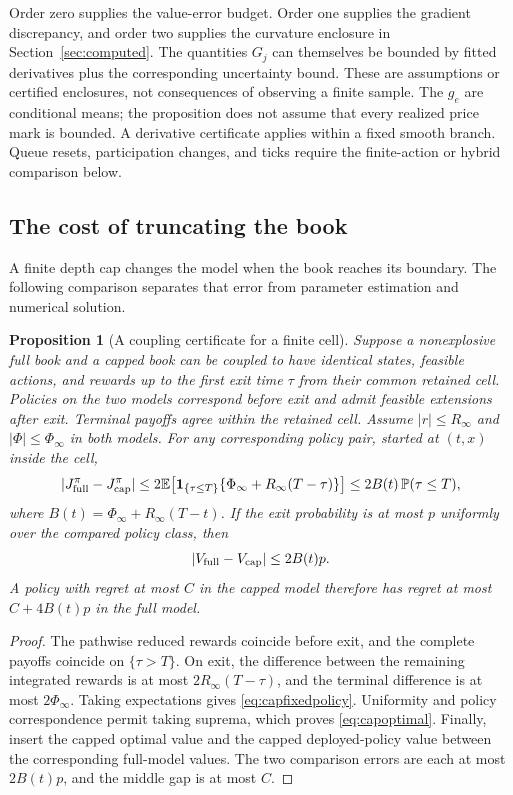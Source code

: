 \documentclass[11pt]{article}
\theoremstyle{plain}
\newtheorem{proposition}[theorem]{Proposition}
\theoremstyle{definition}
\theoremstyle{remark}
\newcommand{\E}{\mathbb E}
\begin{document}
Order zero supplies the value-error budget. Order one supplies the
gradient discrepancy, and order two supplies the curvature enclosure
in Section~\ref{sec:computed}. The quantities \(G_j\) can themselves be
bounded by fitted derivatives plus the corresponding uncertainty
bound. These are assumptions or certified enclosures, not consequences
of observing a finite sample. The \(g_e\) are conditional means;
the proposition does not assume that every realized price mark is
bounded. A derivative certificate applies within a fixed smooth
branch. Queue resets, participation changes, and ticks require the
finite-action or hybrid comparison below.

\subsection{The cost of truncating the book}

A finite depth cap changes the model when the book reaches its
boundary. The following comparison separates that error from
parameter estimation and numerical solution.

\begin{proposition}[A coupling certificate for a finite cell]
\label{prop:booktruncation}
Suppose a nonexplosive full book and a capped book can be coupled to
have identical states, feasible actions, and rewards up to the first
exit time \(\tau\) from their common retained cell. Policies on the two
models correspond before exit and admit feasible extensions after exit.
Terminal payoffs agree within the retained cell.
Assume \(|r|\le R_\infty\) and \(|\Phi|\le\Phi_\infty\) in both models.
For any corresponding policy pair, started at \((t,x)\) inside the cell,
\begin{equation}\label{eq:capfixedpolicy}
 |J_{\rm full}^{\pi}-J_{\rm cap}^{\pi}|
 \le 2\E\!\left[\mathbf1_{\{\tau\le T\}}
       \{\Phi_\infty+R_\infty(T-\tau)\}\right]
 \le 2B(t)\,\mathbb P(\tau\le T),
\end{equation}
where \(B(t)=\Phi_\infty+R_\infty(T-t)\).
If the exit probability is at most \(p\) uniformly over the compared
policy class, then
\begin{equation}\label{eq:capoptimal}
 |V_{\rm full}-V_{\rm cap}|\le2B(t)p.
\end{equation}
A policy with regret at most \(C\) in the capped model therefore has
regret at most \(C+4B(t)p\) in the full model.
\end{proposition}
\begin{proof}
The pathwise reduced rewards coincide before exit, and the complete
payoffs coincide on \(\{\tau>T\}\). On exit, the difference between the
remaining integrated rewards is at most \(2R_\infty(T-\tau)\), and the
terminal difference is at most \(2\Phi_\infty\). Taking expectations
gives \eqref{eq:capfixedpolicy}. Uniformity and policy correspondence
permit taking suprema, which proves \eqref{eq:capoptimal}. Finally,
insert the capped optimal value and the capped deployed-policy value
between the corresponding full-model values. The two comparison
errors are each at most \(2B(t)p\), and the middle gap is at most \(C\).
\end{proof}
\end{document}
